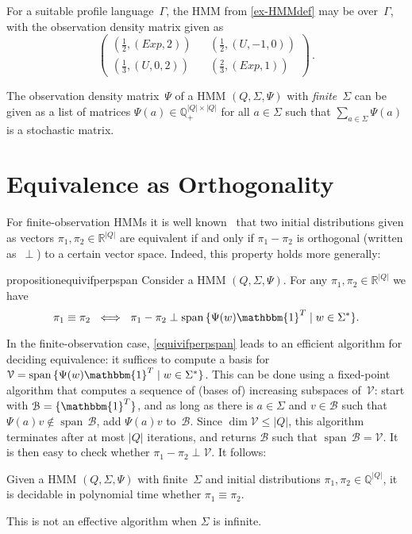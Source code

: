\documentclass[a4paper,UKenglish,cleveref, autoref,mathscr]{lipics-v2019}
\newcommand{\RR}{\mathbb{R}}
\newcommand{\QQ}{\mathbb{Q}}
\newcommand{\Exp}{\mathit{Exp}}
\newcommand{\1}{\mathbbm{1}}
\DeclareMathOperator{\Span}{span\,}
\begin{document}
\begin{example} \label{ex-encoding-prelims}
For a suitable profile language~$\Gamma$, the HMM from \cref{ex-HMMdef} may be over~$\Gamma$, with the observation density matrix given as
\begin{equation}
\begin{pmatrix}
(\frac12, (\Exp,2)) && (\frac12, (U,-1,0)) \\
(\frac13, (U,0,2))  && (\frac23, (\Exp,1))
\end{pmatrix}\,. \tag*{\qed}
\end{equation}
\end{example}
The observation density matrix~$\Psi$ of a HMM $(Q, \Sigma, \Psi)$ with \emph{finite}~$\Sigma$ can be given as a
list of matrices $\Psi(a) \in \QQ_+^{|Q| \times |Q|}$ for all $a \in \Sigma$ such that $\sum_{a \in \Sigma} \Psi(a)$ is a stochastic matrix.

\section{Equivalence as Orthogonality} \label{sec-equivalence-as-orthogonality}

For finite-observation HMMs it is well known~\cite{schut61,Paz71,Tzeng92,CortesMRdistance} that two initial distributions given as vectors $\pi_1, \pi_2 \in \RR^{|Q|}$ are equivalent if and only if $\pi_1 - \pi_2$ is orthogonal (written as~$\perp$) to a certain vector space.
Indeed, this property holds more generally:

\begin{restatable}{proposition}{equivifperpspan}\label{equivifperpspan}
Consider a HMM $(Q, \Sigma, \Psi)$.
For any $\pi_1, \pi_2 \in \RR^{|Q|}$ we have
\[\pi_1 \equiv \pi_2 \ \iff \ \pi_1 - \pi_2 \perp \Span \{\Psi(w)\1^T \mid w \in \Sigma^*\}.\]
\end{restatable}
In the finite-observation case, \cref{equivifperpspan} leads to an efficient algorithm for deciding equivalence: it suffices to compute a basis for $\mathcal{V} = \Span \{\Psi(w)\1^T \mid w \in \Sigma^*\}$.
This can be done using a fixed-point algorithm that computes a sequence of (bases of) increasing subspaces of~$\mathcal{V}$: start with $\mathcal{B} = \{\1^T\}$, and as long as there is $a \in \Sigma$ and $v \in \mathcal{B}$ such that $\Psi(a) v \not\in \Span \mathcal{B}$, add $\Psi(a) v$ to~$\mathcal{B}$.
Since $\dim \mathcal{V} \le |Q|$, this algorithm terminates after at most $|Q|$ iterations, and returns $\mathcal{B}$ such that $\Span \mathcal{B} = \mathcal{V}$.
It is then easy to check whether $\pi_1 - \pi_2 \perp \mathcal{V}$.
It follows:
\begin{proposition} \label{prop-finite-HMM}
Given a HMM $(Q, \Sigma, \Psi)$ with finite~$\Sigma$ and initial distributions $\pi_1, \pi_2 \in \QQ^{|Q|}$, it is decidable in polynomial time whether $\pi_1 \equiv \pi_2$.
\end{proposition}
This is not an effective algorithm when $\Sigma$ is infinite.
\end{document}
